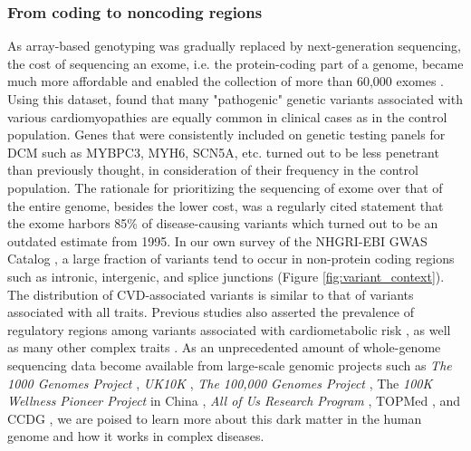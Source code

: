 \documentclass[letter]{bib}
\begin{document}
\subsubsection*{From coding to noncoding regions}	
	As array-based genotyping was gradually replaced by next-generation sequencing, the cost of sequencing an exome, i.e. the protein-coding part of a genome, became much more affordable and enabled the collection of more than 60,000 exomes \citep{Lek:2016:Analysis}. Using this dataset, \cite{Walsh:2017:Reassessment} found that many "pathogenic" genetic variants associated with various cardiomyopathies are equally common in clinical cases as in the control population. Genes that were consistently included on genetic testing panels for DCM such as MYBPC3, MYH6, SCN5A, etc. turned out to be less penetrant than previously thought, in consideration of their frequency in the control population. The rationale for prioritizing the sequencing of exome over that of the entire genome, besides the lower cost, was a regularly cited statement that the exome harbors 85\% of disease-causing variants \citep{Antonarakis:2001:nature} which turned out to be an outdated estimate from 1995. In our own survey of the NHGRI-EBI GWAS Catalog \citep{MacArthur:2017:new}, a large fraction of variants tend to occur in non-protein coding regions such as intronic, intergenic, and splice junctions (Figure \ref{fig:variant_context}). The distribution of CVD-associated variants is similar to that of variants associated with all traits. Previous studies also asserted the prevalence of regulatory regions among variants associated with cardiometabolic risk \citep{Franzen:2016:Cardiometabolic}, as well as many other complex traits \citep{Pickrell:2014:Joint}. As an unprecedented amount of whole-genome sequencing data become available from large-scale genomic projects such as \textit{The 1000 Genomes Project} \citep{1000G:2015:global}, \textit{UK10K} \citep{TheUK10KConsortium:2015:UK10K}, \textit{The 100,000 Genomes Project} \citep{Caulfield:2017:100K}, The \textit{100K Wellness Pioneer Project} in China \citep{Kalia:2017:China}, \textit{All of Us Research Program} \citep{NIH:2018:All}, TOPMed \citep{NHLBI:2014:TransOmics}, and CCDG \citep{NHGRI:2016:CCDG}, we are poised to learn more about this dark matter in the human genome and how it works in complex diseases.
\end{document}
